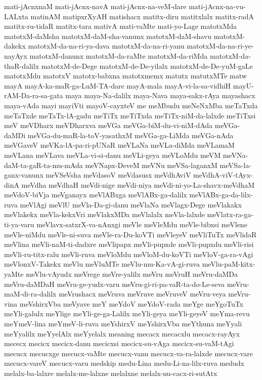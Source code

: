 {mati-jAcnxnaM
mati-jAcnx-navA
mati-jAcnx-na-veM-dare
mati-jAcnx-na-vu-LALxta
matinAM
matipxrXyAH
matishacx
matitx-diru
matitxlalx
matitx-radA
matitx-ru-tidaR
matitx-tara
mativA
mati-vaMte
mati-yo-Lage
matotxMda
matotxM-daMsha
matotxM-daM-sha-vanunx
matotxM-daM-shavu
matotxM-dakekx
matotxM-da-na-ri-ya-dava
matotxM-da-na-ri-yanu
matotxM-da-na-ri-ye-nayAyx
matotxM-danunx
matotxM-da-raMte
matotxM-da-riMda
matotxM-da-thaR-dalilx
matotxM-de-Dege
matotxM-de-De-yilalx
matotxM-de-De-yuM-gaLe
matotxMdu
matotxV
matotx-babxna
matotxmemx
matutx
matutxMTe
matw
mayA
mayA-ka-maR-ga-LuM-TA-dare
mayA-mala
mayA-vi-la-sa-vidhiH
mayU-rAM-Da-ra-sa-gata
maya
maya-Na-dalilx
maya-Nava
maya-sakx-rAya
mayashacx
maya-vAda
mayi
mayiVti
mayoV-cayxteV
me
meMbudu
meNeNxMba
meTaTxda
meTaTxde
meTaTx-lA-gadu
meTiTx
meTiTxda
meTiTx-niM-da-lalxde
meTiTxsi
meV
meVDharx
meVDharxva
meVGa
meVGa-biM-du-vi-niM-dAda
meVGa-daMDi
meVGa-du-maR-la-toV-yasathxM
meVGa-ga-LiMda
meVGa-nAda
meVGaveV
meVKa-lA-pa-ri-pUNaR
meVLaNa
meVLa-diMda
meVLamaM
meVLana
meVLava
meVLa-vi-si-danu
meVLi-geya
meVLoMdu
meVM
meVNa-daM-ta-gaR-ta-mu-mAda
meVNapx-DeveM
meVNu
meVSa-laganxM
meVSa-la-ganx-vanunx
meVSeVsha
meVdasoV
meVdasusx
meVdhAviV
meVdhA-viV-tAyx-dinA
meVdha
meVdhaH
meVdi-nige
meVdi-niya
meVdi-ni-yo-La-shavx-meVdhaM
meVdoV-biVja
meVganayx
meVlABxga
meVlABx-ga-dalilx
meVlABx-ga-da-lilx-ruva
meVlAgi
meVlU
meVla-Da-gi-danu
meVlaNa
meVlagx-Dege
meVlakakx
meVlakekx
meVla-kekxVri
meVlakxMDa
meVlalalx
meVla-lalxde
meVlatx-ra-ga-ti-ya-varu
meVlavx-satxrX-va-nAnxgi
meVle
meVleMdu
meVle-bibxsi
meVlene
meVle-niMdu
meVle-ni-suva
meVle-ra-Du-koVTi
meVleyeV
meVliTuTx
meVlidaR
meVlina
meVli-naM-ti-dadxre
meVlipapx
meVli-pupxde
meVli-pupxdu
meVli-risi
meVli-ru-titx-ralu
meVli-ruva
meVloMdu
meVloM-du-koVTi
meVloV-ga-ra-vAgi
meVlonxV-Takekx
meVlu
meVluMTe
meVlu-mu-Ka-vA-gi-ruva
meVlu-paM-kitx-yaMte
meVlu-vAyudx
meVrege
meVre-yalilx
meVru
meVruH
meVru-daMDa
meVru-daMDaH
meVru-ge-yudx-varu
meVru-gi-ri-pa-vaR-ta-do-Le-seva
meVru-maM-di-ra-dalilx
meVrushacx
meVruva
meVruve
meVruveV
meVru-veya
meVru-vina
meVshirxVba
meVyave
meY
meYdoV
meYdoV-rada
meYge
meYgoTuTx
meYli-galulx
meYlige
meYli-ge-ga-Lalilx
meYli-geya
meYli-geyeV
meYma-revu
meYmeV-lina
meYmeV-li-ruva
meYshirxV
meYshirxVba
meYthuna
meYyali
meYyalilx
meYyelAlx
meYyelalx
meaning
mecacx
mecacxlu
mecacx-rayAyx
mececx
mecicx
mecicx-danu
mecicxsi
mecicx-su-vAga
mecicx-su-vaM-tAgi
mecucx
mecucxge
mecucx-vaMte
mecucx-vanu
mecucx-va-ra-lalxde
mecucx-vare
mecucx-vareV
mecucx-varu
medskip
medu-Lina
medu-Li-na-lilx-ruva
medudx
melalx-ba-lalxre
melalx-me-lalxne
melalxne
melalx-nu-cacx-ri-sutAtx
}
